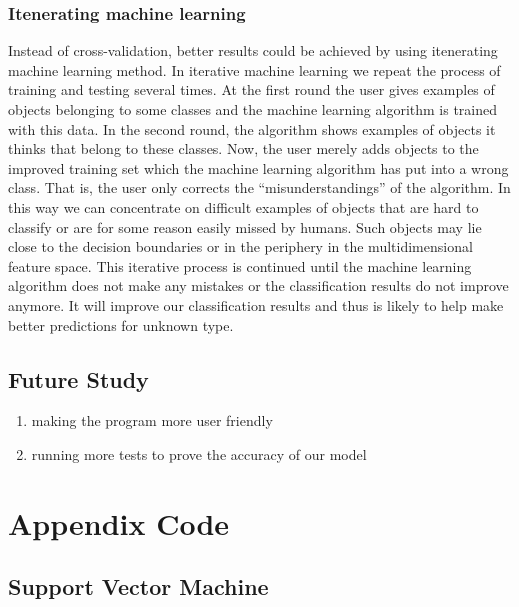 \documentclass[10pt,letterpaper]{article}
\providecommand{\tightlist}{%
  \setlength{\itemsep}{0pt}\setlength{\parskip}{0pt}}
\begin{document}
\subsubsection{Itenerating machine
learning}\label{itenerating-machine-learning}

Instead of cross-validation, better results could be achieved by using
itenerating machine learning method. In iterative machine learning we
repeat the process of training and testing several times. At the first
round the user gives examples of objects belonging to some classes and
the machine learning algorithm is trained with this data. In the second
round, the algorithm shows examples of objects it thinks that belong to
these classes. Now, the user merely adds objects to the improved
training set which the machine learning algorithm has put into a wrong
class. That is, the user only corrects the ``misunderstandings'' of the
algorithm. In this way we can concentrate on difficult examples of
objects that are hard to classify or are for some reason easily missed
by humans. Such objects may lie close to the decision boundaries or in
the periphery in the multidimensional feature space. This iterative
process is continued until the machine learning algorithm does not make
any mistakes or the classification results do not improve anymore. It
will improve our classification results and thus is likely to help make
better predictions for unknown type.

\subsection{Future Study}\label{future-study}

\begin{enumerate}
\def\labelenumi{\arabic{enumi}.}
\tightlist
\item
  making the program more user friendly
\item
  running more tests to prove the accuracy of our model
\end{enumerate}

\section{Appendix Code}\label{appendix-code}

\subsection{Support Vector Machine}\label{support-vector-machine}
\end{document}

